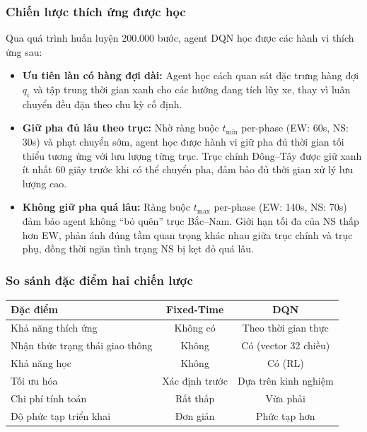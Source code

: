 \subsubsection{Chiến lược thích ứng được học}

Qua quá trình huấn luyện 200.000 bước, agent DQN học được các hành vi thích ứng sau:

\begin{itemize}
    \item \textbf{Ưu tiên làn có hàng đợi dài:} Agent học cách quan sát đặc trưng hàng đợi $q_i$ và tập trung thời gian xanh cho các hướng đang tích lũy xe, thay vì luân chuyển đều đặn theo chu kỳ cố định.

    \item \textbf{Giữ pha đủ lâu theo trục:} Nhờ ràng buộc $t_{\min}$ per-phase (EW: 60s, NS: 30s) và phạt chuyển sớm, agent học được hành vi giữ pha đủ thời gian tối thiểu tương ứng với lưu lượng từng trục. Trục chính Đông--Tây được giữ xanh ít nhất 60 giây trước khi có thể chuyển pha, đảm bảo đủ thời gian xử lý lưu lượng cao.

    \item \textbf{Không giữ pha quá lâu:} Ràng buộc $t_{\max}$ per-phase (EW: 140s, NS: 70s) đảm bảo agent không ``bỏ quên'' trục Bắc--Nam. Giới hạn tối đa của NS thấp hơn EW, phản ánh đúng tầm quan trọng khác nhau giữa trục chính và trục phụ, đồng thời ngăn tình trạng NS bị kẹt đỏ quá lâu.
\end{itemize}

\subsubsection{So sánh đặc điểm hai chiến lược}

\begin{center}
\begin{tabular}{|l|c|c|}
\hline
\textbf{Đặc điểm} & \textbf{Fixed-Time} & \textbf{DQN} \\
\hline
Khả năng thích ứng & Không có & Theo thời gian thực \\
Nhận thức trạng thái giao thông & Không & Có (vector 32 chiều) \\
Khả năng học & Không & Có (RL) \\
Tối ưu hóa & Xác định trước & Dựa trên kinh nghiệm \\
Chi phí tính toán & Rất thấp & Vừa phải \\
Độ phức tạp triển khai & Đơn giản & Phức tạp hơn \\
\hline
\end{tabular}
\end{center}


